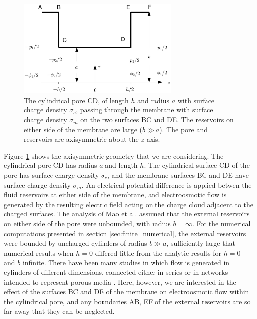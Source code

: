 \begin{figure}[H]
\begin{center}
\includegraphics[width=0.7\textwidth]{finite_thickness/finite_pore_pic1.eps}
\caption{The cylindrical pore CD, of length $h$ and radius $a$ with surface charge density $\sigma_c$, passing through the membrane with surface charge density $\sigma_m$ on the two surfaces BC and DE. The reservoirs on either side of the membrane are large ($b\gg a$). The pore and reservoirs are axisymmetric about the $z$ axis.}
\label{Fig:schematic}
\end{center}
\end{figure}

Figure \ref{Fig:schematic} shows the axisymmetric geometry that we are considering. The cylindrical pore CD has radius $a$ and length $h$.
The cylindrical surface CD of the pore has surface charge density $\sigma_c$, and the membrane surfaces BC and DE have surface charge density $\sigma_m$. An electrical potential difference is applied betwen the fluid reservoirs at either side of the membrane, and electroosmotic flow is generated by the resulting electric field acting on the charge cloud adjacent to the charged surfaces.
The analysis of Mao et al.\cite{mao2014} assumed that the external reservoirs on either side of the pore were unbounded, with radius $b=\infty$. For the numerical computations presented in section \ref{sec:finite_numerical}, the external reservoirs were bounded by uncharged cylinders of radius $b\gg a$,  sufficiently large that numerical results when $h=0$ differed little from the analytic results for $h=0$ and $b$ infinite.  There have been many studies in which flow is generated in cylinders of different dimensions, connected either in series \cite{biscombe2012} or in networks intended to represent porous media \cite{jin1991}. Here, however, we are interested in the effect of the surfaces BC and DE of the membrane on electroosmotic flow within the cylindrical pore, and any boundaries AB, EF of the external reservoirs are so far away that they can be neglected.

